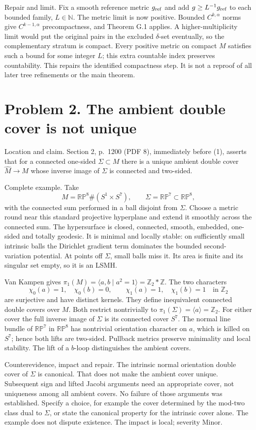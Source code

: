 \documentclass[10pt]{article}
\begin{document}
Repair and limit. Fix a smooth reference metric \(g_{\rm ref}\) and add \(g\geq L^{-1}g_{\rm ref}\) to each bounded family, \(L\in\mathbb N\). The metric limit is now positive. Bounded \(C^{k,\alpha}\) norms give \(C^{k-1,\alpha}\) precompactness, and Theorem G.1 applies. A higher-multiplicity limit would put the original pairs in the excluded \(\delta\)-set eventually, so the complementary stratum is compact. Every positive metric on compact \(M\) satisfies such a bound for some integer \(L\); this extra countable index preserves countability. This repairs the identified compactness step. It is not a reproof of all later tree refinements or the main theorem.\par
\section*{Problem 2. The ambient double cover is not unique}
Location and claim. Section 2, p. 1200 (PDF 8), immediately before (1), asserts that for a connected one-sided \(\Sigma\subset M\) there is a unique ambient double cover \(\widehat M\to M\) whose inverse image of \(\Sigma\) is connected and two-sided.\par
Complete example. Take \[M=\mathbb{RP}^8\#(S^1\times S^7),\qquad
 \Sigma=\mathbb{RP}^7\subset\mathbb{RP}^8,\] with the connected sum performed in a ball disjoint from \(\Sigma\). Choose a metric round near this standard projective hyperplane and extend it smoothly across the connected sum. The hypersurface is closed, connected, smooth, embedded, one-sided and totally geodesic. It is minimal and locally stable: on sufficiently small intrinsic balls the Dirichlet gradient term dominates the bounded second-variation potential. At points off \(\Sigma\), small balls miss it. Its area is finite and its singular set empty, so it is an LSMH.\par
Van Kampen gives \(\pi_1(M)=\langle a,b\mid a^2=1\rangle=\mathbb Z_2*\mathbb Z\). The two characters \[\chi_0(a)=1,\quad\chi_0(b)=0,\qquad
 \chi_1(a)=1,\quad\chi_1(b)=1
 \quad\text{in }\mathbb Z_2\] are surjective and have distinct kernels. They define inequivalent connected double covers over \(M\). Both restrict nontrivially to \(\pi_1(\Sigma)=\langle a\rangle=\mathbb Z_2\). For either cover the full inverse image of \(\Sigma\) is its connected cover \(S^7\). The normal line bundle of \(\mathbb{RP}^7\) in \(\mathbb{RP}^8\) has nontrivial orientation character on \(a\), which is killed on \(S^7\); hence both lifts are two-sided. Pullback metrics preserve minimality and local stability. The lift of a \(b\)-loop distinguishes the ambient covers.\par
Counterevidence, impact and repair. The intrinsic normal orientation double cover of \(\Sigma\) is canonical. That does not make the ambient cover unique. Subsequent sign and lifted Jacobi arguments need an appropriate cover, not uniqueness among all ambient covers. No failure of those arguments was established. Specify a choice, for example the cover determined by the mod-two class dual to \(\Sigma\), or state the canonical property for the intrinsic cover alone. The example does not dispute existence. The impact is local; severity Minor.\par
\end{document}
